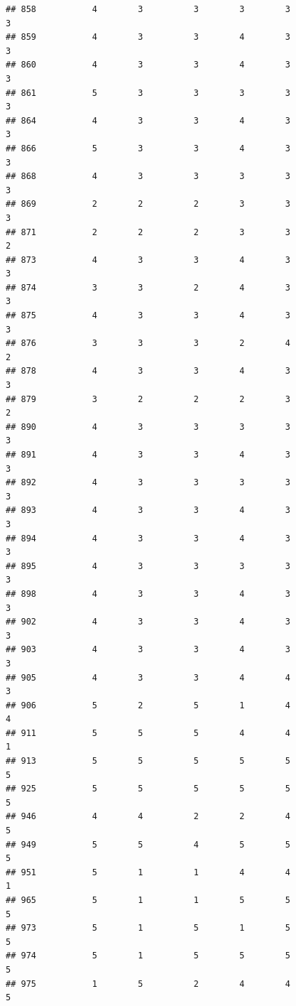 \documentclass[
]{article}
\begin{document}
\begin{verbatim}
## 858           4        3          3        3        3               3
## 859           4        3          3        4        3               3
## 860           4        3          3        4        3               3
## 861           5        3          3        3        3               3
## 864           4        3          3        4        3               3
## 866           5        3          3        4        3               3
## 868           4        3          3        3        3               3
## 869           2        2          2        3        3               3
## 871           2        2          2        3        3               2
## 873           4        3          3        4        3               3
## 874           3        3          2        4        3               3
## 875           4        3          3        4        3               3
## 876           3        3          3        2        4               2
## 878           4        3          3        4        3               3
## 879           3        2          2        2        3               2
## 890           4        3          3        3        3               3
## 891           4        3          3        4        3               3
## 892           4        3          3        3        3               3
## 893           4        3          3        4        3               3
## 894           4        3          3        4        3               3
## 895           4        3          3        3        3               3
## 898           4        3          3        4        3               3
## 902           4        3          3        4        3               3
## 903           4        3          3        4        3               3
## 905           4        3          3        4        4               3
## 906           5        2          5        1        4               4
## 911           5        5          5        4        4               1
## 913           5        5          5        5        5               5
## 925           5        5          5        5        5               5
## 946           4        4          2        2        4               5
## 949           5        5          4        5        5               5
## 951           5        1          1        4        4               1
## 965           5        1          1        5        5               5
## 973           5        1          5        1        5               5
## 974           5        1          5        5        5               5
## 975           1        5          2        4        4               5

\end{verbatim}
\end{document}
